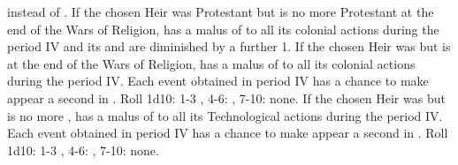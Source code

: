 instead of \ENG.
\bparag If the chosen Heir was Protestant but \FRA is no more Protestant at
the end of the Wars of Religion, \FRA has a malus of  to all its
colonial actions during the period IV and its \FTI and \DTI are diminished by
a further 1.
\bparag If the chosen Heir was \CATHCO but \FRA is \CATHCR at the end of the
Wars of Religion, \FRA has a malus of  to all its colonial actions
during the period IV.  Each event \RD obtained in period IV has a chance to
make appear a second \REVOLT \faceplus in \FRA. Roll 1d10: 1-3
\provincePoitou, 4-6: \provinceGuyenne, 7-10: none.
\bparag If the chosen Heir was \CATHCR but \FRA is no more \CATHCR, \FRA has a
malus of  to all its Technological actions during the period IV.
Each event \RD obtained in period IV has a chance to make appear a second
\REVOLT \faceplus in \FRA. Roll 1d10: 1-3 \provinceArmor, 4-6:
\provinceOrleanais, 7-10: none.


